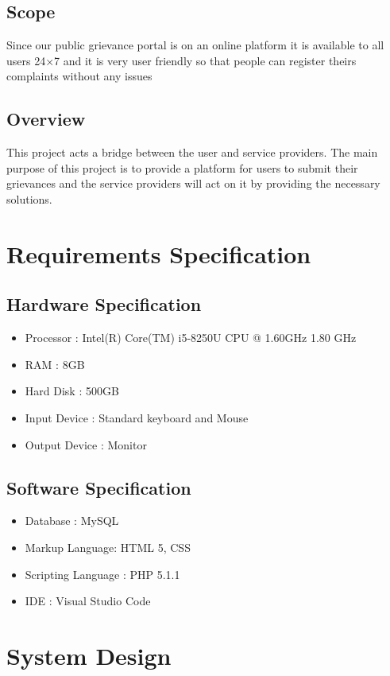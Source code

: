 \documentclass[12pt,a4paper]{report}
\begin{document}
\section{Scope}
Since our public grievance portal is on an online platform it is available to all users 24×7 and it is very user friendly so that people can register theirs complaints without any issues
\section{Overview}
This project acts a bridge between the user and service providers. The main purpose of this project is to provide a platform for users to submit their grievances and the service providers will act on it by providing the necessary solutions.
\chapter{Requirements Specification}
\section{Hardware Specification}
\begin{itemize}
\item Processor : Intel(R) Core(TM) i5-8250U CPU @ 1.60GHz   1.80 GHz
\item RAM : 8GB
\item Hard Disk : 500GB
\item Input Device : Standard keyboard and Mouse
\item Output Device : Monitor
\end{itemize}
\section{Software Specification}
\begin{itemize}
\item Database : MySQL 
\item Markup Language: HTML 5, CSS
\item Scripting Language : PHP 5.1.1
\item IDE : Visual Studio Code
\end{itemize}

\chapter{System Design}
\end{document}
